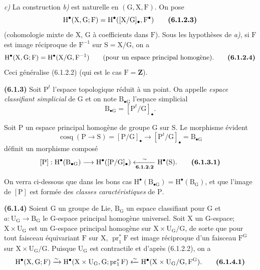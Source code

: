 \documentclass[11pt,leqno]{article}
\begin{document}
\textit{c)} La construction \textit{b)} est naturelle en \((\mathrm{G},\mathrm{X},\mathrm{F})\). On pose
\[
\mathrm{H}^{\bullet}(\mathrm{X},\mathrm{G};\mathrm{F})
=\mathrm{H}^{\bullet}([\mathrm{X}/\mathrm{G}]_{\bullet},\mathrm{F}^{\bullet})
\tag*{\textbf{(6.1.2.3)}}
\]
(cohomologie mixte de \(\mathrm{X}\), \(\mathrm{G}\) à coefficients dans \(\mathrm{F}\)). Sous les hypothèses de \textit{a)}, si \(\mathrm{F}\) est image réciproque de \(\mathrm{F}^{-1}\) sur \(\mathrm{S}=\mathrm{X}/\mathrm{G}\), on a
\[
\mathrm{H}^{\bullet}(\mathrm{X},\mathrm{G};\mathrm{F})
=\mathrm{H}^{\bullet}(\mathrm{X}/\mathrm{G},\mathrm{F}^{-1})
\qquad\text{(pour un espace principal homogène).}
\tag*{\textbf{(6.1.2.4)}}
\]
Ceci généralise (6.1.2.2) (qui est le cas \(\mathrm{F}=\mathbf{Z}\)).

\textbf{(6.1.3)} Soit \(\mathrm{P}^{t}\) l’espace topologique réduit à un point. On appelle \textit{espace classifiant simplicial} de \(\mathrm{G}\) et on note \(\mathrm{B}_{\bullet\mathrm{G}}\) l’espace simplicial
\[
\mathrm{B}_{\bullet\mathrm{G}}=[\mathrm{P}^{t}/\mathrm{G}]_{\bullet}.
\]

Soit \(\mathrm{P}\) un espace principal homogène de groupe \(\mathrm{G}\) sur \(\mathrm{S}\). Le morphisme évident
\[
\operatorname{cosq}(\mathrm{P}\to\mathrm{S})
=[\mathrm{P}/\mathrm{G}]_{\bullet}
\to[\mathrm{P}^{t}/\mathrm{G}]_{\bullet}
=\mathrm{B}_{\bullet\mathrm{G}}
\]
définit un morphisme composé
\[
[\mathrm{P}]:
\mathrm{H}^{\bullet}(\mathrm{B}_{\bullet\mathrm{G}})
\longrightarrow
\mathrm{H}^{\bullet}([\mathrm{P}/\mathrm{G}]_{\bullet})
\xleftarrow[\text{\textbf{6.1.2.2}}]{\sim}
\mathrm{H}^{\bullet}(\mathrm{S}).
\tag*{\textbf{(6.1.3.1)}}
\]

On verra ci-dessous que dans les bons cas \(\mathrm{H}^{\bullet}(\mathrm{B}_{\bullet\mathrm{G}})=\mathrm{H}^{\bullet}(\mathrm{B}_{\mathrm{G}})\), et que l’image de \([\mathrm{P}]\) est formée des \textit{classes caractéristiques} de \(\mathrm{P}\).

\textbf{(6.1.4)} Soient \(\mathrm{G}\) un groupe de Lie, \(\mathrm{B}_{\mathrm{G}}\) un espace classifiant pour \(\mathrm{G}\) et \(a:\mathrm{U}_{\mathrm{G}}\to\mathrm{B}_{\mathrm{G}}\) le \(\mathrm{G}\)-espace principal homogène universel. Soit \(\mathrm{X}\) un \(\mathrm{G}\)-espace; \(\mathrm{X}\times\mathrm{U}_{\mathrm{G}}\) est un \(\mathrm{G}\)-espace principal homogène sur \(\mathrm{X}\times\mathrm{U}_{\mathrm{G}}/\mathrm{G}\), de sorte que pour tout faisceau équivariant \(\mathrm{F}\) sur \(\mathrm{X}\), \(\operatorname{pr}_1^*\mathrm{F}\) est image réciproque d’un faisceau \(\mathrm{F}^{\mathrm{G}}\) sur \(\mathrm{X}\times\mathrm{U}_{\mathrm{G}}/\mathrm{G}\). Puisque \(\mathrm{U}_{\mathrm{G}}\) est contractile et d’après (6.1.2.2), on a
\[
\mathrm{H}^{\bullet}(\mathrm{X},\mathrm{G};\mathrm{F})
\xrightarrow{\sim}
\mathrm{H}^{\bullet}(\mathrm{X}\times\mathrm{U}_{\mathrm{G}},\mathrm{G};
\operatorname{pr}_1^*\mathrm{F})
\xleftarrow{\sim}
\mathrm{H}^{\bullet}(\mathrm{X}\times\mathrm{U}_{\mathrm{G}}/\mathrm{G},\mathrm{F}^{\mathrm{G}}).
\tag*{\textbf{(6.1.4.1)}}
\]
\end{document}
